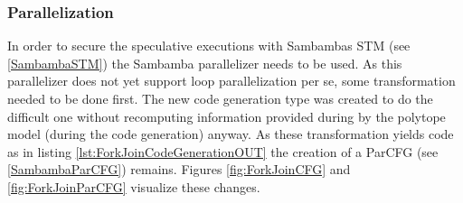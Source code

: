 \subsubsection*{Parallelization}

In order to secure the speculative executions with Sambambas STM
(see \ref{SambambaSTM}) the Sambamba parallelizer needs to be used.
As this parallelizer does not yet support loop parallelization per se, some 
transformation needed to be done first. The new code generation type was created
to do the difficult one without recomputing information provided during by the
polytope model (during the code generation) anyway. As these transformation
yields code as in listing \ref{lst:ForkJoinCodeGenerationOUT} the creation of
a ParCFG (see \ref{SambambaParCFG}) remains. Figures \ref{fig:ForkJoinCFG} and
\ref{fig:ForkJoinParCFG} visualize these changes.



